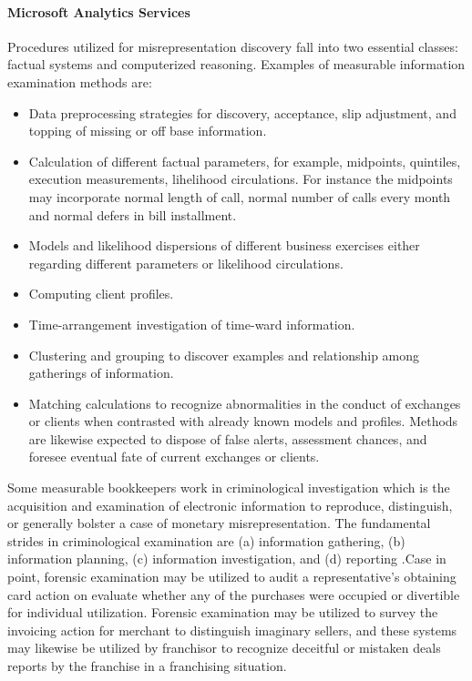 \paragraph{Microsoft Analytics Services}
Procedures utilized for misrepresentation discovery fall into two essential classes: factual systems and computerized reasoning. Examples of measurable information examination methods are: 

\begin{itemize}
\item Data preprocessing strategies for discovery, acceptance, slip adjustment, and topping of missing or off base information.
\item Calculation of different factual parameters, for example, midpoints, quintiles, execution measurements, lihelihood circulations. For instance the midpoints may incorporate normal length of call, normal number of calls every month and normal defers in bill installment.
\item Models and likelihood dispersions of different business exercises either regarding different parameters or likelihood circulations.
\item Computing client profiles.
\item Time-arrangement investigation of time-ward information.
\item Clustering and grouping to discover examples and relationship among gatherings of information.
\item Matching calculations to recognize abnormalities in the conduct of exchanges or clients when contrasted with already known models and profiles. Methods are likewise expected to dispose of false alerts, assessment chances, and foresee eventual fate of current exchanges or clients. %
\end{itemize}

Some measurable bookkeepers work in criminological investigation which is the acquisition and examination of electronic information to reproduce, distinguish, or generally bolster a case of monetary misrepresentation. The fundamental strides in criminological examination are (a) information gathering, (b) information planning, (c) information investigation, and (d) reporting \cite{16}.Case in point, forensic examination may be utilized to audit a representative's obtaining card action on evaluate whether any of the purchases were occupied or divertible for individual utilization. Forensic examination may be utilized to survey the invoicing action for merchant to distinguish imaginary sellers, and these systems may likewise be utilized by franchisor to recognize deceitful or mistaken deals reports by the franchise in a franchising situation.

